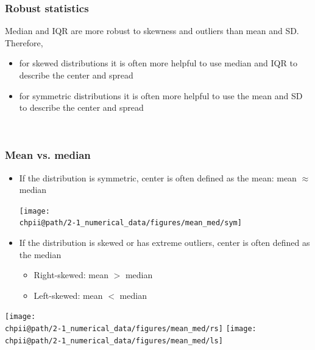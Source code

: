\documentclass[slidestop,compress,mathserif]{beamer}
\makeatletter
\newcommand{\soln}[1]{\textit{#1}}
\def\chpii@path{../../Chp 2}
\makeatother
\begin{document}

\begin{frame}
\frametitle{Robust statistics}

Median and IQR are more robust to skewness and outliers than mean and SD. Therefore,

\begin{itemize}
\item for skewed distributions it is often more helpful to use median and IQR to describe the center and spread
\item for symmetric distributions it is often more helpful to use the mean and SD to describe the center and spread
\end{itemize}

$\:$ \\

\pause


\soln{}

\end{frame}


\begin{frame}
\frametitle{Mean vs. median}

\begin{itemize}

\item If the distribution is symmetric, center is often defined as the mean: mean $\approx$ median

\begin{center}
\texttt{[image: \\chpii@path/2-1\_numerical\_data/figures/mean\_med/sym]}
\end{center}

\item If the distribution is skewed or has extreme outliers, center is often defined as the median
\begin{itemize}
\item Right-skewed: mean $>$ median
\item Left-skewed: mean $<$ median \\
\end{itemize}

\end{itemize}

\begin{center}
\texttt{[image: \\chpii@path/2-1\_numerical\_data/figures/mean\_med/rs]}
\texttt{[image: \\chpii@path/2-1\_numerical\_data/figures/mean\_med/ls]}\\
\end{center}

\end{frame}
\end{document}
